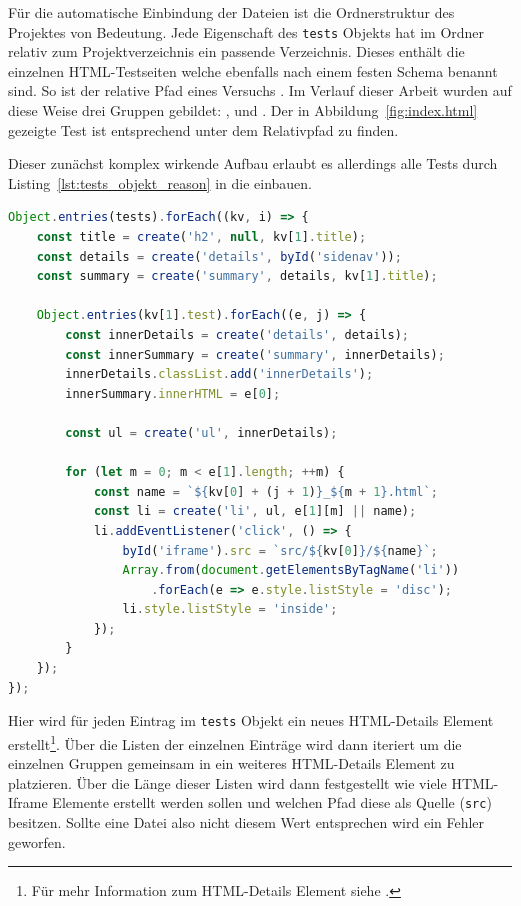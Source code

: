 Für die automatische Einbindung der Dateien ist die Ordnerstruktur des Projektes von Bedeutung.
Jede Eigenschaft des \lstinline{tests} Objekts hat im  Ordner relativ zum Projektverzeichnis ein passende Verzeichnis.
Dieses enthält die einzelnen HTML-Testseiten welche ebenfalls nach einem festen Schema benannt sind.
So ist der relative Pfad eines Versuchs .
Im Verlauf dieser Arbeit wurden auf diese Weise drei Gruppen gebildet: ,  und .
Der in Abbildung~\ref{fig:index.html} gezeigte Test ist entsprechend unter dem Relativpfad  zu finden.

Dieser zunächst komplex wirkende Aufbau erlaubt es allerdings alle Tests durch Listing~\ref{lst:tests_objekt_reason} in die  einbauen.

\begin{lstlisting}[language=JavaScript, caption={Iteration über das tests Objekt zur Population der index.html.}, label={lst:tests_objekt_reason}]
Object.entries(tests).forEach((kv, i) => {
    const title = create('h2', null, kv[1].title);
    const details = create('details', byId('sidenav'));
    const summary = create('summary', details, kv[1].title);

    Object.entries(kv[1].test).forEach((e, j) => {
        const innerDetails = create('details', details);
        const innerSummary = create('summary', innerDetails);
        innerDetails.classList.add('innerDetails');
        innerSummary.innerHTML = e[0];

        const ul = create('ul', innerDetails);

        for (let m = 0; m < e[1].length; ++m) {
            const name = `${kv[0] + (j + 1)}_${m + 1}.html`;
            const li = create('li', ul, e[1][m] || name);
            li.addEventListener('click', () => {
                byId('iframe').src = `src/${kv[0]}/${name}`;
                Array.from(document.getElementsByTagName('li'))
                    .forEach(e => e.style.listStyle = 'disc');
                li.style.listStyle = 'inside';
            });
        }
    });
});
\end{lstlisting}

Hier wird für jeden Eintrag im \lstinline{tests} Objekt ein neues HTML-Details Element erstellt\footnote{Für mehr Information zum HTML-Details Element siehe .}.
Über die Listen der einzelnen Einträge wird dann iteriert um die einzelnen Gruppen gemeinsam in ein weiteres HTML-Details Element zu platzieren.
Über die Länge dieser Listen wird dann festgestellt wie viele HTML-Iframe Elemente erstellt werden sollen und welchen Pfad diese als Quelle (\lstinline{src}) besitzen.
Sollte eine Datei also nicht diesem Wert entsprechen wird ein Fehler geworfen.

